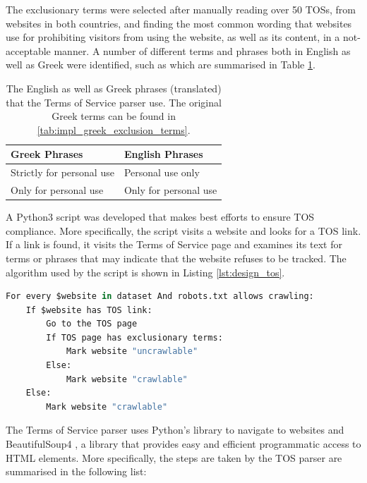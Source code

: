 \documentclass[../main.tex]{subfiles}
\begin{document}
The exclusionary terms were selected after manually reading over 50 TOSs, from websites in both countries, and finding the most common wording that websites use for prohibiting visitors from using the website, as well as its content, in a not-acceptable manner. A number of different terms and phrases both in English as well as Greek were identified, such as  which are summarised in Table \ref{tab:design_tos_terms}.

\begin{table}[ht]
    \centering
    \begin{tabular}{@{}ll@{}}
        \toprule
        \textbf{Greek Phrases}    & \textbf{English Phrases} \\ \midrule
        Strictly for personal use & Personal use only        \\
        Only for personal use     & Only for personal use    \\ \bottomrule
    \end{tabular}
    \caption{The English as well as Greek phrases (translated) that the Terms of Service parser use. The original Greek terms can be found in \ref{tab:impl_greek_exclusion_terms}.}
    \label{tab:design_tos_terms}
\end{table}

A Python3 script was developed that makes best efforts to ensure TOS compliance. More specifically, the script visits a website and looks for a TOS link. If a link is found, it visits the Terms of Service page and examines its text for terms or phrases that may indicate that the website refuses to be tracked. The algorithm used by the script is shown in Listing \ref{lst:design_tos}.

\begin{lstlisting}[language=Python, caption=Pseudocode of the algorithm that the Terms of Service parser uses., label=lst:design_tos,captionpos=b, style=lst_style]
For every $website in dataset And robots.txt allows crawling:
    If $website has TOS link:
        Go to the TOS page
        If TOS page has exclusionary terms:
            Mark website "uncrawlable"
        Else:
            Mark website "crawlable"
    Else:
        Mark website "crawlable"
\end{lstlisting}

The Terms of Service parser uses Python’s  library to navigate to websites and BeautifulSoup4 \cite{richardson2007beautiful}, a library that provides easy and efficient programmatic access to HTML elements. More specifically, the steps are taken by the TOS parser are summarised in the following list:
\end{document}
